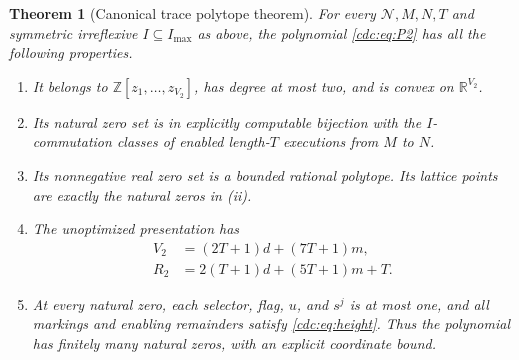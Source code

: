 \documentclass[11pt,a4paper]{article}
\newtheorem{theorem}{Theorem}[section]
\theoremstyle{definition}
\theoremstyle{remark}
\newcommand{\Z}{\mathbb Z}
\newcommand{\R}{\mathbb R}
\newcommand{\Net}{\mathcal N}
\begin{document}
\begin{theorem}[Canonical trace polytope theorem]\label{cdc:thm:main}
For every $\Net,M,N,T$ and symmetric irreflexive $I\subseteq I_{\max}$ as above, the polynomial \eqref{cdc:eq:P2} has all the following properties.
\begin{enumerate}[label=\textup{(\roman*)}]
\item It belongs to $\Z[z_1,\ldots,z_{V_2}]$, has degree at most two, and is convex on $\R^{V_2}$.
\item Its natural zero set is in explicitly computable bijection with the $I$-commutation classes of enabled length-$T$ executions from $M$ to $N$.
\item Its nonnegative real zero set is a bounded rational polytope. Its lattice points are exactly the natural zeros in \textup{(ii)}.
\item The unoptimized presentation has
\begin{align}
V_2&=(2T+1)d+(7T+1)m,\label{cdc:eq:V2}\\
R_2&=2(T+1)d+(5T+1)m+T.\label{cdc:eq:R2}
\end{align}
\item At every natural zero, each selector, flag, $u$, and $s^j$ is at most one, and all markings and enabling remainders satisfy \eqref{cdc:eq:height}. Thus the polynomial has finitely many natural zeros, with an explicit coordinate bound.
\end{enumerate}
\end{theorem}
\end{document}
